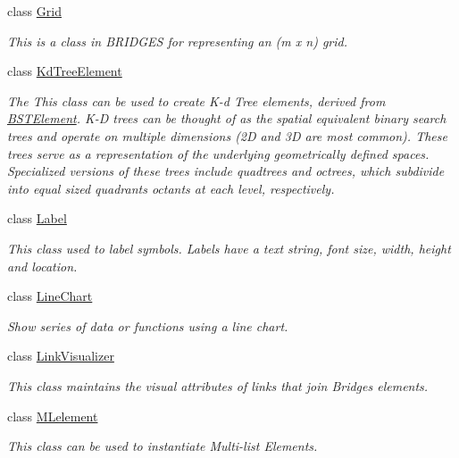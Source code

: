 \begin{DoxyCompactItemize}
class \hyperlink{classbridges_1_1base_1_1_grid}{Grid}
\begin{DoxyCompactList}\small\item\em This is a class in B\+R\+I\+D\+G\+ES for representing an (m x n) grid. \end{DoxyCompactList}\item 
class \hyperlink{classbridges_1_1base_1_1_kd_tree_element}{Kd\+Tree\+Element}
\begin{DoxyCompactList}\small\item\em The This class can be used to create K-\/d Tree elements, derived from \hyperlink{classbridges_1_1base_1_1_b_s_t_element}{B\+S\+T\+Element}. K-\/D trees can be thought of as the spatial equivalent binary search trees and operate on multiple dimensions (2D and 3D are most common). These trees serve as a representation of the underlying geometrically defined spaces. Specialized versions of these trees include quadtrees and octrees, which subdivide into equal sized quadrants octants at each level, respectively. \end{DoxyCompactList}\item 
class \hyperlink{classbridges_1_1base_1_1_label}{Label}
\begin{DoxyCompactList}\small\item\em This class used to label symbols. Labels have a text string, font size, width, height and location. \end{DoxyCompactList}\item 
class \hyperlink{classbridges_1_1base_1_1_line_chart}{Line\+Chart}
\begin{DoxyCompactList}\small\item\em Show series of data or functions using a line chart. \end{DoxyCompactList}\item 
class \hyperlink{classbridges_1_1base_1_1_link_visualizer}{Link\+Visualizer}
\begin{DoxyCompactList}\small\item\em This class maintains the visual attributes of links that join Bridges elements. \end{DoxyCompactList}\item 
class \hyperlink{classbridges_1_1base_1_1_m_lelement}{M\+Lelement}
\begin{DoxyCompactList}\small\item\em This class can be used to instantiate Multi-\/list Elements. \end{DoxyCompactList}\item 

\end{DoxyCompactItemize}
